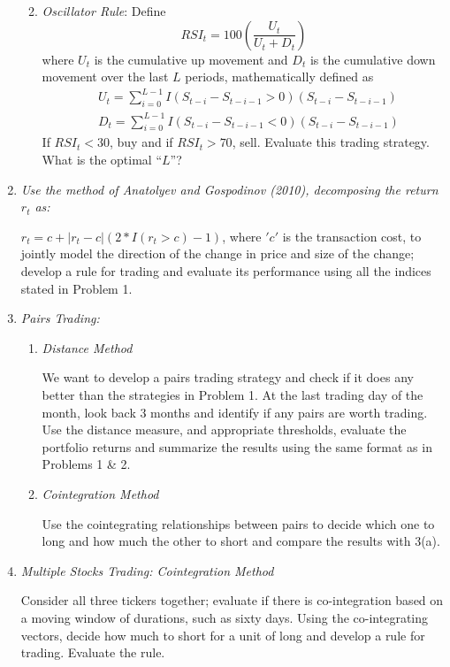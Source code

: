 \documentclass[12pt]{article}
\begin{document}
\begin{enumerate}
\begin{enumerate}
\begin{itemize}
\end{itemize}
\item{\it Oscillator Rule}: Define
$$RSI_t = 100\left(\frac{U_t}{U_t+D_t}\right)$$
where $U_t$ is the cumulative up movement and $D_t$ is the cumulative down movement over the last $L$ periods, mathematically defined as
\begin{align*}
&U_t = \sum_{i=0}^{L-1}I(S_{t-i} - S_{t-i-1}>0)(S_{t-i}-S_{t-i-1})\\
&D_t = \sum_{i=0}^{L-1}I(S_{t-i} - S_{t-i-1}<0)(S_{t-i}-S_{t-i-1})
\end{align*}
If $RSI_t<30$, buy and if $RSI_t>70$, sell. Evaluate this trading strategy. What is the optimal ``$L$''?

\end{enumerate}

\item {\it Use the method of Anatolyev and Gospodinov (2010), decomposing the return $r_t$ as:}

$r_t = c + |r_t - c| (2 * I(r_t > c) -1)$, where $'c'$ is the transaction cost, to jointly model the direction of the change in price and size of the change; develop a rule for trading and evaluate its performance using all the indices stated in Problem 1.

\item {\it Pairs Trading:}
\begin{enumerate}
\item{\it Distance Method}

We want to develop a pairs trading strategy and check if it does any better than  the strategies in Problem 1. At the last trading day of the month, look back 3 months and identify if any pairs are worth trading. Use the distance measure, and appropriate thresholds, evaluate the portfolio returns and summarize the results using the same format as in Problems 1 \& 2.
\item{\it Cointegration Method}

Use the cointegrating relationships between pairs to decide which one to long and how much the other to short and compare the results with 3(a).

\end{enumerate}

\item {\it Multiple Stocks Trading: Cointegration Method}

Consider all three tickers together; evaluate if there is co-integration based on a moving window of durations, such as sixty days. Using the co-integrating vectors, decide how much to short for a unit of long and develop a rule for trading. Evaluate the rule.


\end{enumerate}
\end{document}
